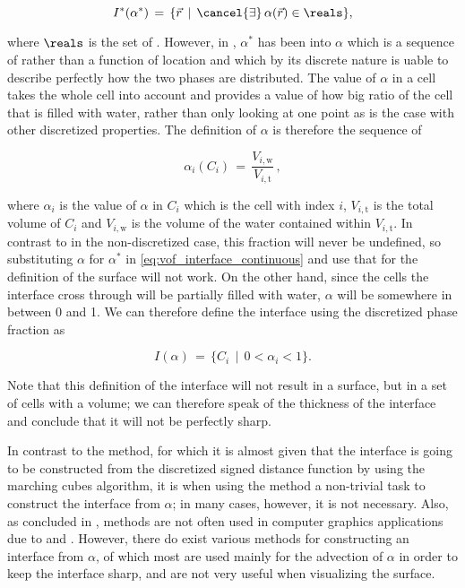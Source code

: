 \begin{equation} \label{eq:vof_interface_continuous}
I^*(\alpha^*) \,=\, \{\vec{r} \,\mid\, \cancel{\exists}\,\alpha(\vec{r})\in\reals\},
\end{equation}

where $\reals$ is the set of . However, in \thisprojectwork, $\alpha^*$ has been \discretized into $\alpha$ which is a sequence of  rather than a function of location and which by its discrete nature is uable to describe perfectly how the two phases are distributed. The value of $\alpha$ in a cell takes the whole cell into account and provides a value of how big ratio of the cell that is filled with water, rather than only looking at one point as is the case with other discretized properties. The definition of $\alpha$ is therefore the sequence of

\begin{equation} \label{eq:phase_fraction_discretized}
\alpha_i(C_i) \,=\, \frac{V_{i,\text{w}}}{V_{i,\text{t}}}\,,
\end{equation}

where $\alpha_i$ is the value of $\alpha$ in $C_i$ which is the cell with index $i$, $V_{i,\text{t}}$ is the total volume of $C_i$ and $V_{i,\text{w}}$ is the volume of the water contained within $V_{i,\text{t}}$. In contrast to in the non-discretized case, this fraction will never be undefined, so substituting $\alpha$ for $\alpha^*$ in \eqref{eq:vof_interface_continuous} and use that for the definition of the surface will not work. On the other hand, since the cells the interface cross through will be partially filled with water, $\alpha$ will be somewhere in between 0 and 1. We can therefore define the interface using the discretized phase fraction as

\begin{equation} \label{eq:vof_interface_discrete}
I(\alpha) \,=\, \{C_i \,\mid\, 0 < \alpha_i < 1\}.
\end{equation}

Note that this definition of the interface will not result in a surface, but in a set of cells with a volume; we can therefore speak of the thickness of the interface and conclude that it will not be perfectly sharp.

In contrast to the \LS method, for which it is almost given that the interface is going to be constructed from the discretized signed distance function by using the marching cubes algorithm, it is when using the \VOF method a non-trivial task to construct the interface from $\alpha$; in many cases, however, it is not necessary. Also, as concluded in \citep{Wojtan2009}, \VOF methods are not often used in computer graphics applications due to  and . However, there do exist various methods for constructing an interface from $\alpha$, of which most are used mainly for the advection of $\alpha$ in order to keep the interface sharp, and are not very useful when visualizing the surface.

